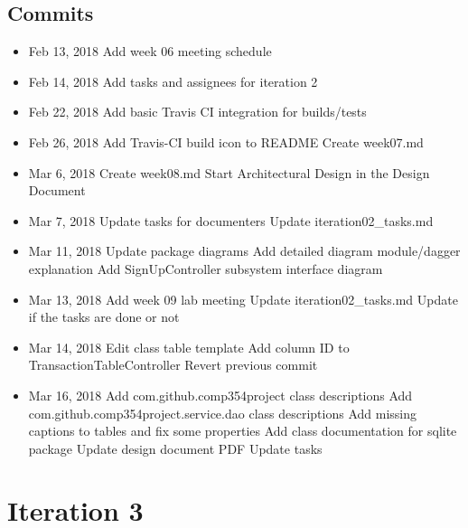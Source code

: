 \documentclass[12pt]{article}
\begin{document}
\subsection{Commits}
\begin{itemize}
    \item Feb 13, 2018
        \subitem [DOC] Add week 06 meeting schedule
    \item Feb 14, 2018
        \subitem [DOC] Add tasks and assignees for iteration 2
    \item Feb 22, 2018
        \subitem [BUILD] Add basic Travis CI integration for builds/tests
    \item Feb 26, 2018
        \subitem [BUILD] Add Travis-CI build icon to README
        \subitem Create week07.md
    \item Mar 6, 2018
        \subitem Create week08.md
        \subitem [DOC] Start Architectural Design in the Design Document
        \subitem
    \item Mar 7, 2018
        \subitem [DOC] Update tasks for documenters
        \subitem Update iteration02\_tasks.md
    \item Mar 11, 2018
        \subitem [DOC] Update package diagrams
        \subitem [DOC] Add detailed diagram module/dagger explanation
        \subitem [DOC] Add SignUpController subsystem interface diagram
    \item Mar 13, 2018
        \subitem Add week 09 lab meeting
        \subitem Update iteration02\_tasks.md
        \subitem Update if the tasks are done or not
    \item Mar 14, 2018
        \subitem [DOC] Edit class table template
        \subitem [FEAT] Add column ID to TransactionTableController
        \subitem [REVERT] Revert previous commit
    \item Mar 16, 2018
        \subitem [DOC] Add com.github.comp354project class descriptions
        \subitem [DOC] Add com.github.comp354project.service.dao class descriptions
        \subitem [DOC] Add missing captions to tables and fix some properties
        \subitem [DOC] Add class documentation for sqlite package
        \subitem [DOC] Update design document PDF
        \subitem [DOC] Update tasks
\end{itemize}

\section{Iteration 3}
\end{document}
